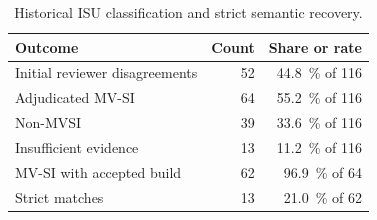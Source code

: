 \begin{table}
  \caption{Historical ISU classification and strict semantic recovery.}
  \label{tab:historical-recovery}
  \centering
  \small
  \begin{tabular}{lrr}
    \toprule
    Outcome & Count & Share or rate \\
    \midrule
    Initial reviewer disagreements & 52 & \SI{44.8}{\percent} of 116 \\
    Adjudicated MV-SI       & 64 & \SI{55.2}{\percent} of 116 \\
    Non-MVSI                & 39 & \SI{33.6}{\percent} of 116 \\
    Insufficient evidence   & 13 & \SI{11.2}{\percent} of 116 \\
    MV-SI with accepted build & 62 & \SI{96.9}{\percent} of 64 \\
    Strict matches          & 13 & \SI{21.0}{\percent} of 62 \\
    \bottomrule
  \end{tabular}
\end{table}
